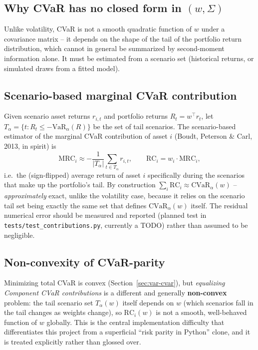 \documentclass[11pt]{article}
\newcommand{\Var}{\mathrm{VaR}}
\newcommand{\CVar}{\mathrm{CVaR}}
\begin{document}
\subsection{Why CVaR has no closed form in $(w, \Sigma)$}

Unlike volatility, CVaR is not a smooth quadratic function of $w$ under a
covariance matrix -- it depends on the shape of the tail of the portfolio
return distribution, which cannot in general be summarized by
second-moment information alone. It must be estimated from a scenario set
(historical returns, or simulated draws from a fitted model).

\subsection{Scenario-based marginal CVaR contribution}

Given scenario asset returns $r_{i,t}$ and portfolio returns
$R_t = w^\top r_t$, let $T_\alpha = \{t : R_t \leq -\Var_\alpha(R)\}$ be
the set of tail scenarios. The scenario-based estimator of the marginal
CVaR contribution of asset $i$ (Boudt, Peterson \& Carl, 2013, in spirit)
is
\[
\text{MRC}_i \approx -\frac{1}{|T_\alpha|} \sum_{t \in T_\alpha} r_{i,t},
\qquad
\text{RC}_i = w_i \cdot \text{MRC}_i,
\]
i.e.\ the (sign-flipped) average return of asset $i$ specifically during
the scenarios that make up the portfolio's tail. By construction
$\sum_i \text{RC}_i \approx \CVar_\alpha(w)$ -- \emph{approximately}
exact, unlike the volatility case, because it relies on the scenario tail
set being exactly the same set that defines $\CVar_\alpha(w)$ itself. The
residual numerical error should be measured and reported (planned test in
\texttt{tests/test\_contributions.py}, currently a TODO) rather than
assumed to be negligible.

\subsection{Non-convexity of CVaR-parity}

Minimizing total CVaR is convex (Section~\ref{sec:var-cvar}), but
\emph{equalizing Component CVaR contributions} is a different and
generally \textbf{non-convex} problem: the tail scenario set
$T_\alpha(w)$ itself depends on $w$ (which scenarios fall in the tail
changes as weights change), so $\text{RC}_i(w)$ is not a smooth,
well-behaved function of $w$ globally. This is the central
implementation difficulty that differentiates this project from a
superficial ``risk parity in Python'' clone, and it is treated
explicitly rather than glossed over.
\end{document}
